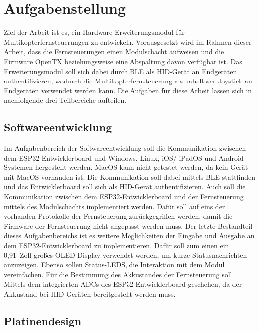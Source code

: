 
\chapter{Aufgabenstellung}

Ziel der Arbeit ist es, ein Hardware-Erweiterungsmodul für Multikopterfernsteuerungen zu entwickeln. Vorausgesetzt wird im Rahmen dieser Arbeit, dass die Fernsteuerungen einen Modulschacht aufweisen und die Firmware OpenTX \cite{opentxMain} beziehungsweise eine Abspaltung davon verfügbar ist. Das Erweiterungsmodul soll sich dabei durch \acs{BLE} als \acs{HID}-Gerät an Endgeräten authentifizieren, wodurch die Multikopterfernsteuerung als kabelloser Joystick an Endgeräten verwendet werden kann. Die Aufgaben für diese Arbeit lassen sich in nachfolgende drei Teilbereiche aufteilen.

\section{Softwareentwicklung}

Im Aufgabenbereich der Softwareentwicklung soll die Kommunikation zwischen dem ESP32-Entwicklerboard und Windows, Linux, iOS/ iPadOS und Android-Systemen hergestellt werden. MacOS kann nicht getestet werden, da kein Gerät mit MacOS vorhanden ist. Die Kommunikation soll dabei mittels \acs{BLE} stattfinden und das Entwicklerboard soll sich als \acs{HID}-Gerät authentifizieren. Auch soll die Kommunikation zwischen dem ESP32-Entwicklerboard und der Fernsteuerung mittels des Modulschachts implementiert werden. Dafür soll auf eins der vorhanden Protokolle der Fernsteuerung zurückgegriffen werden, damit die Firmware der Fernsteuerung nicht angepasst werden muss. Der letzte Bestandteil dieses Aufgabenbereichs ist es weitere Möglichkeiten der Eingabe und Ausgabe an dem ESP32-Entwicklerboard zu implementieren. Dafür soll zum einen ein 0,91~Zoll großes OLED-Display verwendet werden, um kurze Statusnachrichten anzuzeigen. Ebenso sollen Status-LEDS, die Interaktion mit dem Modul vereinfachen. Für die Bestimmung des Akkustandes der Fernsteuerung soll Mittels dem integrierten \acp{ADC} des ESP32-Entwicklerboard geschehen, da der Akkustand bei \acs{HID}-Geräten bereitgestellt werden muss.

\section{Platinendesign}

